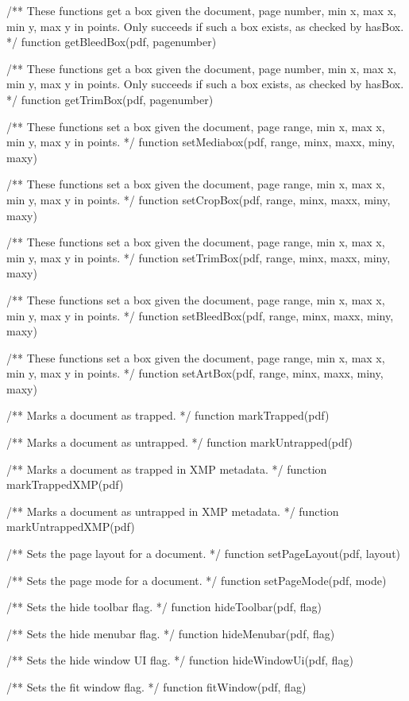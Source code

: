/** These functions get a box given the document, page number, min x, max x,
min y, max y in points. Only succeeds if such a box exists, as checked by
hasBox. */
function getBleedBox(pdf, pagenumber)

/** These functions get a box given the document, page number, min x, max x,
min y, max y in points. Only succeeds if such a box exists, as checked by
hasBox. */
function getTrimBox(pdf, pagenumber)

/** These functions set a box given the document, page range, min x, max x,
min y, max y in points. */
function setMediabox(pdf, range, minx, maxx, miny, maxy)

/** These functions set a box given the document, page range, min x, max x,
min y, max y in points. */
function setCropBox(pdf, range, minx, maxx, miny, maxy)

/** These functions set a box given the document, page range, min x, max x,
min y, max y in points. */
function setTrimBox(pdf, range, minx, maxx, miny, maxy)

/** These functions set a box given the document, page range, min x, max x,
min y, max y in points. */
function setBleedBox(pdf, range, minx, maxx, miny, maxy)

/** These functions set a box given the document, page range, min x, max x,
min y, max y in points. */
function setArtBox(pdf, range, minx, maxx, miny, maxy)

/** Marks a document as trapped. */
function markTrapped(pdf)

/** Marks a document as untrapped. */
function markUntrapped(pdf)

/** Marks a document as trapped in XMP metadata. */
function markTrappedXMP(pdf)

/** Marks a document as untrapped in XMP metadata. */
function markUntrappedXMP(pdf)


/** Sets the page layout for a document. */
function setPageLayout(pdf, layout)

/** Sets the page mode for a document. */
function setPageMode(pdf, mode)

/** Sets the hide toolbar flag. */
function hideToolbar(pdf, flag)

/** Sets the hide menubar flag. */
function hideMenubar(pdf, flag)

/** Sets the hide window UI flag. */
function hideWindowUi(pdf, flag)

/** Sets the fit window flag. */
function fitWindow(pdf, flag)

